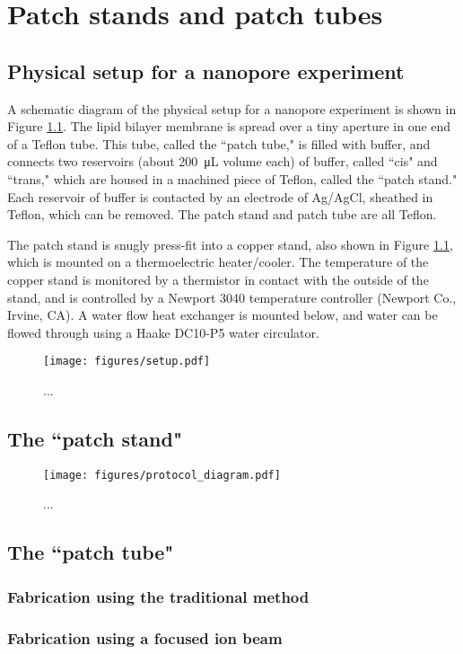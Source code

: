 \chapter{Patch stands and patch tubes}
\label{patch_stands_tubes}

\section{Physical setup for a nanopore experiment}

A schematic diagram of the physical setup for a nanopore experiment is shown in Figure \ref{fig:physical_setup}.  The lipid bilayer membrane is spread over a tiny aperture in one end of a Teflon tube.  This tube, called the ``patch tube," is filled with buffer, and connects two reservoirs (about \SI{200}{\uL} volume each) of buffer, called ``cis" and ``trans," which are housed in a machined piece of Teflon, called the ``patch stand."  Each reservoir of buffer is contacted by an electrode of Ag/AgCl, sheathed in Teflon, which can be removed.  The patch stand and patch tube are all Teflon.

The patch stand is snugly press-fit into a copper stand, also shown in Figure \ref{fig:physical_setup}, which is mounted on a thermoelectric heater/cooler.  The temperature of the copper stand is monitored by a thermistor in contact with the outside of the stand, and is controlled by a Newport 3040 temperature controller (Newport Co., Irvine, CA).  A water flow heat exchanger is mounted below, and water can be flowed through using a Haake DC10-P5 water circulator.

\begin{figure}[h]
\begin{centering}
\texttt{[image: figures/setup.pdf]}
\caption[Diagram of physical experimental setup]{...}
\label{fig:physical_setup}
\end{centering}
\end{figure}



\section{The ``patch stand"}

\begin{figure}[h]
\begin{centering}
\texttt{[image: figures/protocol\_diagram.pdf]}
\caption[Schematic of patch stand]{...}
\label{fig:patch_stand}
\end{centering}
\end{figure}

\section{The ``patch tube"}

\subsection{Fabrication using the traditional method}

\subsection{Fabrication using a focused ion beam}